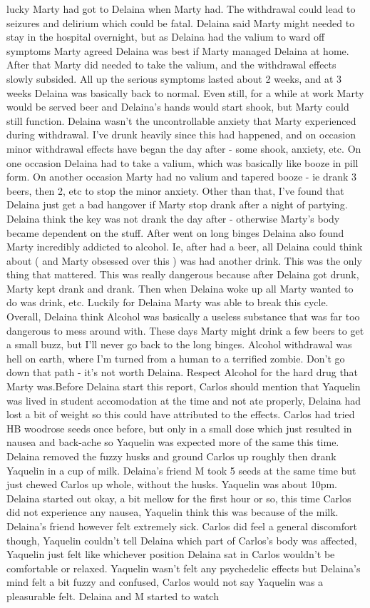 \documentclass[12pt]{book}
\begin{document}
lucky Marty had got to Delaina when Marty had. The withdrawal could lead to seizures and delirium which could be fatal. Delaina said Marty might needed to stay in the hospital overnight, but as Delaina had the valium to ward off symptoms Marty agreed Delaina was best if Marty managed Delaina at home. After that Marty did needed to take the valium, and the withdrawal effects slowly subsided. All up the serious symptoms lasted about 2 weeks, and at 3 weeks Delaina was basically back to normal. Even still, for a while at work Marty would be served beer and Delaina's hands would start shook, but Marty could still function. Delaina wasn't the uncontrollable anxiety that Marty experienced during withdrawal. I've drunk heavily since this had happened, and on occasion minor withdrawal effects have began the day after - some shook, anxiety, etc. On one occasion Delaina had to take a valium, which was basically like booze in pill form. On another occasion Marty had no valium and tapered booze - ie drank 3 beers, then 2, etc to stop the minor anxiety. Other than that, I've found that Delaina just get a bad hangover if Marty stop drank after a night of partying. Delaina think the key was not drank the day after - otherwise Marty's body became dependent on the stuff. After went on long binges Delaina also found Marty incredibly addicted to alcohol. Ie, after had a beer, all Delaina could think about ( and Marty obsessed over this ) was had another drink. This was the only thing that mattered. This was really dangerous because after Delaina got drunk, Marty kept drank and drank. Then when Delaina woke up all Marty wanted to do was drink, etc. Luckily for Delaina Marty was able to break this cycle. Overall, Delaina think Alcohol was basically a useless substance that was far too dangerous to mess around with. These days Marty might drink a few beers to get a small buzz, but I'll never go back to the long binges. Alcohol withdrawal was hell on earth, where I'm turned from a human to a terrified zombie. Don't go down that path - it's not worth Delaina. Respect Alcohol for the hard drug that Marty was.Before Delaina start this report, Carlos should mention that Yaquelin was lived in student accomodation at the time and not ate properly, Delaina had lost a bit of weight so this could have attributed to the effects. Carlos had tried HB woodrose seeds once before, but only in a small dose which just resulted in nausea and back-ache so Yaquelin was expected more of the same this time. Delaina removed the fuzzy husks and ground Carlos up roughly then drank Yaquelin in a cup of milk. Delaina's friend M took 5 seeds at the same time but just chewed Carlos up whole, without the husks. Yaquelin was about 10pm. Delaina started out okay, a bit mellow for the first hour or so, this time Carlos did not experience any nausea, Yaquelin think this was because of the milk. Delaina's friend however felt extremely sick. Carlos did feel a general discomfort though, Yaquelin couldn't tell Delaina which part of Carlos's body was affected, Yaquelin just felt like whichever position Delaina sat in Carlos wouldn't be comfortable or relaxed. Yaquelin wasn't felt any psychedelic effects but Delaina's mind felt a bit fuzzy and confused, Carlos would not say Yaquelin was a pleasurable felt. Delaina and M started to watch 
\end{document}
